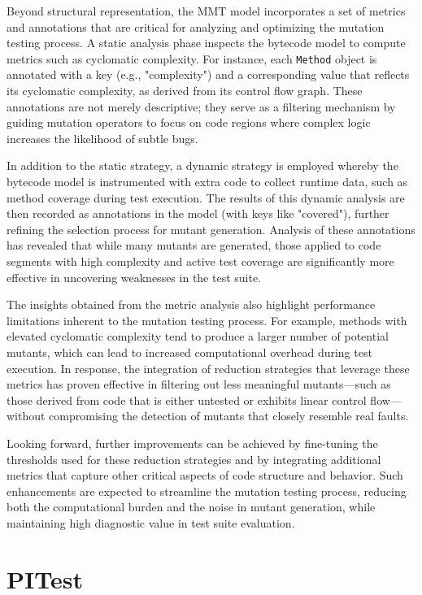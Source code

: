\documentclass[12pt,a4paper]{article}
\begin{document}
Beyond structural representation, the MMT model incorporates a set of metrics
and annotations that are critical for analyzing and optimizing the mutation
testing process. A static analysis phase inspects the bytecode model to
compute metrics such as cyclomatic complexity. For instance, each
\texttt{Method} object is annotated with a key (e.g., "complexity") and a
corresponding value that reflects its cyclomatic complexity, as derived from
its control flow graph. These annotations are not merely descriptive; they
serve as a filtering mechanism by guiding mutation operators to focus on code
regions where complex logic increases the likelihood of subtle bugs.

In addition to the static strategy, a dynamic strategy is employed whereby the
bytecode model is instrumented with extra code to collect runtime data, such
as method coverage during test execution. The results of this dynamic
analysis are then recorded as annotations in the model (with keys like
"covered"), further refining the selection process for mutant generation.
Analysis of these annotations has revealed that while many mutants are
generated, those applied to code segments with high complexity and active
test coverage are significantly more effective in uncovering weaknesses in
the test suite.

The insights obtained from the metric analysis also highlight performance
limitations inherent to the mutation testing process. For example, methods
with elevated cyclomatic complexity tend to produce a larger number of
potential mutants, which can lead to increased computational overhead during
test execution. In response, the integration of reduction strategies that
leverage these metrics has proven effective in filtering out less meaningful
mutants—such as those derived from code that is either untested or exhibits
linear control flow—without compromising the detection of mutants that
closely resemble real faults.

Looking forward, further improvements can be achieved by fine-tuning the
thresholds used for these reduction strategies and by integrating additional
metrics that capture other critical aspects of code structure and behavior.
Such enhancements are expected to streamline the mutation testing process,
reducing both the computational burden and the noise in mutant generation,
while maintaining high diagnostic value in test suite evaluation.

\section{PITest}
\end{document}
